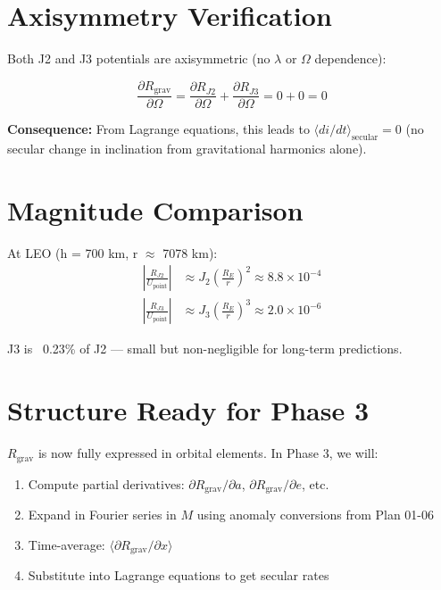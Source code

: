 \documentclass[11pt]{article}
\begin{document}
\section{Axisymmetry Verification}

Both J2 and J3 potentials are axisymmetric (no $\lambda$ or $\Omega$ dependence):

\begin{equation}
\frac{\partial R_{\text{grav}}}{\partial \Omega} = \frac{\partial R_{J2}}{\partial \Omega} + \frac{\partial R_{J3}}{\partial \Omega} = 0 + 0 = 0
\end{equation}

\textbf{Consequence:} From Lagrange equations, this leads to $\langle di/dt \rangle_{\text{secular}} = 0$ (no secular change in inclination from gravitational harmonics alone).

\section{Magnitude Comparison}

At LEO (h = 700 km, r $\approx$ 7078 km):
\begin{align}
\left|\frac{R_{J2}}{U_{\text{point}}}\right| &\approx J_2\left(\frac{R_E}{r}\right)^2 \approx 8.8 \times 10^{-4}\\
\left|\frac{R_{J3}}{U_{\text{point}}}\right| &\approx J_3\left(\frac{R_E}{r}\right)^3 \approx 2.0 \times 10^{-6}
\end{align}

J3 is ~0.23\% of J2 — small but non-negligible for long-term predictions.

\section{Structure Ready for Phase 3}

$R_{\text{grav}}$ is now fully expressed in orbital elements. In Phase 3, we will:
\begin{enumerate}
    \item Compute partial derivatives: $\partial R_{\text{grav}}/\partial a$, $\partial R_{\text{grav}}/\partial e$, etc.
    \item Expand in Fourier series in $M$ using anomaly conversions from Plan 01-06
    \item Time-average: $\langle \partial R_{\text{grav}}/\partial x \rangle$
    \item Substitute into Lagrange equations to get secular rates
\end{enumerate}
\end{document}
